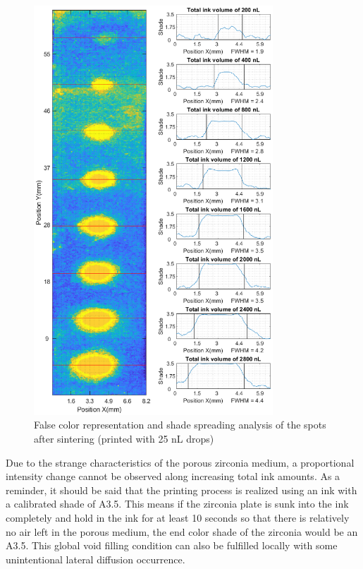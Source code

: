 \begin{figure}[H]
	\centering
	\includegraphics[width=0.8\textwidth]{grafiken/drops25.eps}
	\caption{False color representation and shade spreading analysis of the spots after sintering (printed with 25 nL drops)}
	\label{fig:drops25}
\end{figure} 

\bigskip 

Due to the strange characteristics of the porous zirconia medium, a proportional intensity change cannot be observed along increasing total ink amounts. As a reminder, it should be said that the printing process is realized using an ink with a calibrated shade of A3.5. This means if the zirconia plate is sunk into the ink completely and hold in the ink for at least 10 seconds so that there is relatively no air left in the porous medium, the end color shade of the zirconia would be an A3.5. This global void filling condition can also be fulfilled locally with some unintentional lateral diffusion occurrence. 

